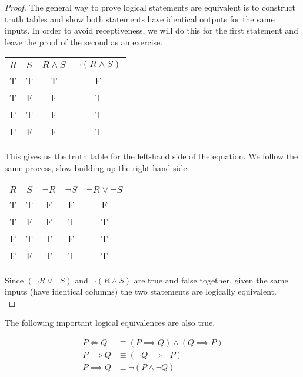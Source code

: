 \documentclass[twoside]{report}
\begin{document}
\begin{proof}
	The general way to prove logical statements are equivalent is to construct truth tables and show both statements have identical outputs for the same inputs. In order to avoid receptiveness, we will do this for the first statement and leave the proof of the second as an exercise.
	
	\vspace{\baselineskip}
	\begin{center}
		\begin{tabular}{cccc}
			$R$ & $S$ & $R \wedge S$ & $\neg(R \wedge S)$ \\
			\midrule
			T & T & T & F \\
			T & F & F & T \\
			F & T & F & T \\
			F & F & F & T \\
		\end{tabular}
	\end{center}
	\vspace{\baselineskip}
	
	This gives us the truth table for the left-hand side of the equation. We follow the same process, slow building up the right-hand side.
	
	\vspace{\baselineskip}
	\begin{center}
		\begin{tabular}{ccccc}
			$R$ & $S$ & $\neg R$ & $\neg S$ & $\neg R \lor \neg S$ \\
			\midrule
			T & T & F & F & F \\
			T & F & F & T & T \\
			F & T & T & F & T \\
			F & F & T & T & T \\
		\end{tabular}
	\end{center}
	
	Since $(\neg R \lor \neg S)$ and $\neg(R \wedge S)$ are true and false together, given the same inputs (have identical columns) the two statements are logically equivalent. \\
\end{proof}
\vspace{\baselineskip}

\vspace{\baselineskip}
\begin{theorem}
	The following important logical equivalences are also true.
	
	\begin{align}
		P \iff Q &\equiv (P \implies Q) \wedge (Q \implies P) \\
		P \implies Q &\equiv (\neg Q \implies \neg P) \\
		P \implies Q &\equiv \neg (P \wedge \neg Q)
	\end{align}
\end{theorem}
\end{document}
